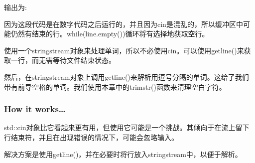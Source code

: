 \begin{itemize}
输出为:


因为这段代码是在数字代码之后运行的，并且因为cin是混乱的，所以缓冲区中可能仍然有结束的行。while(line.empty())循环将有选择地获取空行。

使用一个stringstream对象来处理单词，所以不必使用cin。可以使用getline()来获取一行，而无需等待文件结束状态。

然后，在stringstream对象上调用getline()来解析用逗号分隔的单词。这给了我们带有前导空格的单词。我们使用本章中的trimstr()函数来清理空白字符。
\end{itemize}

\subsubsection{How it works…}


std::cin对象比它看起来更有用，但使用它可能是一个挑战。其倾向于在流上留下行结束符，并且在出现错误的情况下，可能会忽略输入。

解决方案是使用getline()，并在必要时将行放入stringstream中，以便于解析。











